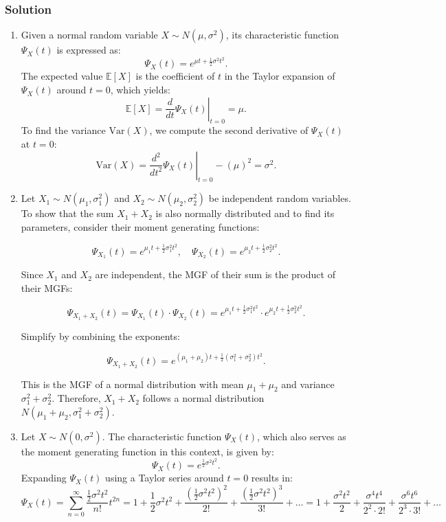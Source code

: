 \documentclass{article}
\begin{document}
\subsubsection*{Solution}
\begin{enumerate}[label=(\alph*)]
    \item Given a normal random variable \( X \sim N(\mu, \sigma^2) \), its characteristic function \( \Psi_X(t) \) is expressed as:
    \[
    \Psi_X(t) = e^{\mu t + \frac{1}{2} \sigma^2 t^2}.
    \]
    The expected value \( \mathbb{E}[X] \) is the coefficient of \( t \) in the Taylor expansion of \( \Psi_X(t) \) around \( t=0 \), which yields:
    \[
    \mathbb{E}[X] = \left. \frac{d}{dt}\Psi_X(t) \right|_{t=0} = \mu.
    \]
    To find the variance \( \text{Var}(X) \), we compute the second derivative of \( \Psi_X(t) \) at \( t=0 \):
    \[
    \text{Var}(X) = \left. \frac{d^2}{dt^2}\Psi_X(t) \right|_{t=0} - (\mu)^2 = \sigma^2.
    \]

    \item Let \( X_1 \sim N(\mu_1, \sigma_1^2) \) and \( X_2 \sim N(\mu_2, \sigma_2^2) \) be independent random variables. To show that the sum \( X_1 + X_2 \) is also normally distributed and to find its parameters, consider their moment generating functions:

    \[
    \Psi_{X_1}(t) = e^{\mu_1 t + \frac{1}{2} \sigma_1^2 t^2}, \quad \Psi_{X_2}(t) = e^{\mu_2 t + \frac{1}{2} \sigma_2^2 t^2}.
    \]
    
    Since \( X_1 \) and \( X_2 \) are independent, the MGF of their sum is the product of their MGFs:
    
    \[
    \Psi_{X_1 + X_2}(t) = \Psi_{X_1}(t) \cdot \Psi_{X_2}(t) = e^{\mu_1 t + \frac{1}{2} \sigma_1^2 t^2} \cdot e^{\mu_2 t + \frac{1}{2} \sigma_2^2 t^2}.
    \]
    
    Simplify by combining the exponents:
    
    \[
    \Psi_{X_1 + X_2}(t) = e^{(\mu_1 + \mu_2) t + \frac{1}{2} (\sigma_1^2 + \sigma_2^2) t^2}.
    \]
    
    This is the MGF of a normal distribution with mean \( \mu_1 + \mu_2 \) and variance \( \sigma_1^2 + \sigma_2^2 \). Therefore, \( X_1 + X_2 \) follows a normal distribution \( N(\mu_1 + \mu_2, \sigma_1^2 + \sigma_2^2) \).
    \item 

    Let \( X \sim N(0, \sigma^2) \). The characteristic function \( \Psi_X(t) \), which also serves as the moment generating function in this context, is given by:
    \[
    \Psi_X(t) = e^{\frac{1}{2} \sigma^2 t^2}.
    \]
    Expanding \( \Psi_X(t) \) using a Taylor series around \( t = 0 \) results in:
    \[
    \Psi_X(t) = \sum_{n=0}^{\infty} \frac{\frac{1}{2}\sigma^2 t^2}{n!} t^{2n} = 1 + \frac{1}{2}\sigma^2 t^2 + \frac{(\frac{1}{2}\sigma^2 t^2)^2}{2!} + \frac{(\frac{1}{2}\sigma^2 t^2)^3}{3!} + \ldots
= 1 + \frac{\sigma^2 t^2}{2 } + \frac{\sigma^4 t^4}{2^2 \cdot 2!} + \frac{\sigma^6 t^6}{2^3 \cdot 3!} + \ldots
    \]
    

\end{enumerate}
\end{document}

